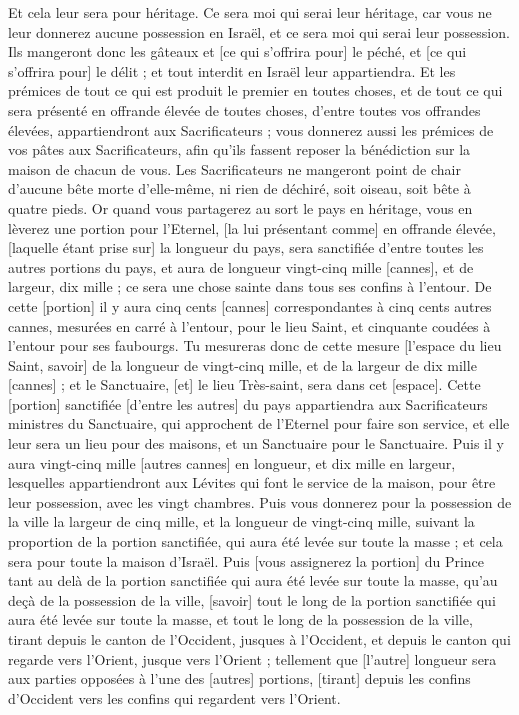 \begin{multicols}{2}
Et cela leur sera pour héritage. Ce sera moi qui serai leur héritage, car vous ne leur donnerez aucune possession en Israël, et ce sera moi qui serai leur possession.
Ils mangeront donc les gâteaux et [ce qui s'offrira pour] le péché, et [ce qui s'offrira pour] le délit ; et tout interdit en Israël leur appartiendra.
Et les prémices de tout ce qui est produit le premier en toutes choses, et de tout ce qui sera présenté en offrande élevée de toutes choses, d'entre toutes vos offrandes élevées, appartiendront aux Sacrificateurs ; vous donnerez aussi les prémices de vos pâtes aux Sacrificateurs, afin qu'ils fassent reposer la bénédiction sur la maison de chacun de vous.
Les Sacrificateurs ne mangeront point de chair d'aucune bête morte d'elle-même, ni rien de déchiré, soit oiseau, soit bête à quatre pieds.
\VerseOne{}Or quand vous partagerez au sort le pays en héritage, vous en lèverez une portion pour l'Eternel, [la lui présentant comme] en offrande élevée, [laquelle étant prise sur] la longueur du pays, sera sanctifiée d'entre toutes les autres portions du pays, et aura de longueur vingt-cinq mille [cannes], et de largeur, dix mille ; ce sera une chose sainte dans tous ses confins à l'entour.
De cette [portion] il y aura cinq cents [cannes] correspondantes à cinq cents autres cannes, mesurées en carré à l'entour, pour le lieu Saint, et cinquante coudées à l'entour pour ses faubourgs.
Tu mesureras donc de cette mesure [l'espace du lieu Saint, savoir] de la longueur de vingt-cinq mille, et de la largeur de dix mille [cannes] ; et le Sanctuaire, [et] le lieu Très-saint, sera dans cet [espace].
Cette [portion] sanctifiée [d'entre les autres] du pays appartiendra aux Sacrificateurs ministres du Sanctuaire, qui approchent de l'Eternel pour faire son service, et elle leur sera un lieu pour des maisons, et un Sanctuaire pour le Sanctuaire.
Puis il y aura vingt-cinq mille [autres cannes] en longueur, et dix mille en largeur, lesquelles appartiendront aux Lévites qui font le service de la maison, pour être leur possession, avec les vingt chambres.
Puis vous donnerez pour la possession de la ville la largeur de cinq mille, et la longueur de vingt-cinq mille, suivant la proportion de la portion sanctifiée, qui aura été levée sur toute la masse ; et cela sera pour toute la maison d'Israël.
Puis [vous assignerez la portion] du Prince tant au delà de la portion sanctifiée qui aura été levée sur toute la masse, qu'au deçà de la possession de la ville, [savoir] tout le long de la portion sanctifiée qui aura été levée sur toute la masse, et tout le long de la possession de la ville, tirant depuis le canton de l'Occident, jusques à l'Occident, et depuis le canton qui regarde vers l'Orient, jusque vers l'Orient ; tellement que [l'autre] longueur sera aux parties opposées à l'une des [autres] portions, [tirant] depuis les confins d'Occident vers les confins qui regardent vers l'Orient.

\end{multicols}
